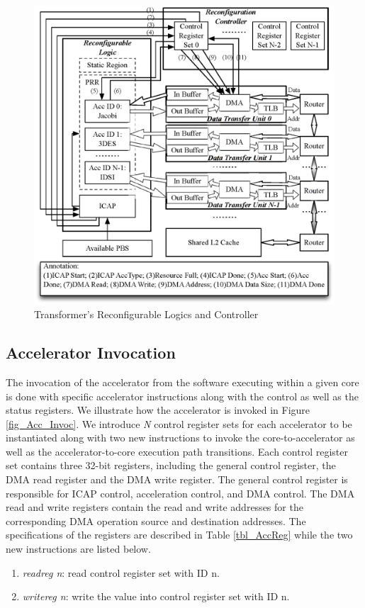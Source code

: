 \begin{figure}
    \centering
    \includegraphics[width=4.0 in]{HPCA14-Controller}
    \caption{Transformer's Reconfigurable Logics and Controller}
    \label{fig_reconfig_controller}
\vspace{-0.05in}
\end{figure}


\subsection{Accelerator Invocation}

The invocation of the accelerator from the software executing within a given core is
done with specific accelerator instructions along with the control as well as the status
registers. We illustrate how the accelerator is invoked in Figure
\ref{fig_Acc_Invoc}. We introduce {\em N} control register sets for
each accelerator to be instantiated along with two new instructions to
invoke the core-to-accelerator as well as the accelerator-to-core execution path
transitions. Each control register set contains three 32-bit registers, including the
general control register, the DMA read register and the DMA write
register. The general control register is responsible for ICAP control,
acceleration control, and DMA control. The DMA read and write registers
contain the read and write addresses for the corresponding DMA operation source and destination
addresses. The specifications of the registers are described in Table
\ref{tbl_AccReg} while the two new instructions are listed below.

\begin{enumerate}
\item{\em readreg n}: read control register set with ID n.
\item{\em writereg n}: write the value into control register set with ID n.
\end{enumerate}

